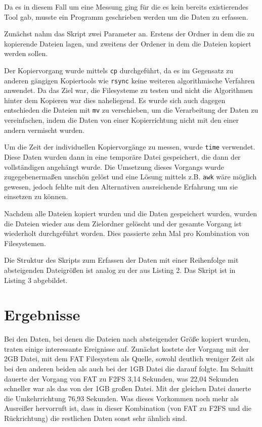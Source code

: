 \documentclass[11pt,parskip=full]{scrartcl}
\begin{document}
	Da es in diesem Fall um eine Messung ging für die es kein bereits existierendes Tool gab, musste ein Programm geschrieben werden um die Daten zu erfassen.
	
	Zunächst nahm das Skript zwei Parameter an. Erstens der Ordner in dem die zu kopierende Dateien lagen, und zweitens der Ordener in dem die Dateien kopiert werden sollen.
	
	Der Kopiervorgang wurde mittels \lstinline|cp| durchgeführt, da es im Gegensatz zu anderen gängigen Kopiertools wie \lstinline|rsync| keine weiteren algorithmische Verfahren anwendet. Da das Ziel war, die Filesysteme zu testen und nicht die Algorithmen hinter dem Kopieren war dies naheliegend. Es wurde sich auch dagegen entschieden die Dateien mit \lstinline|mv| zu verschieben, um die Verarbeitung der Daten zu vereinfachen, indem die Daten von einer Kopierrichtung nicht mit den einer andern vermischt wurden.
	
	Um die Zeit der individuellen Kopiervorgänge zu messen, wurde \lstinline|time| verwendet. Diese Daten wurden dann in eine temporäre Datei gespeichert, die dann der vollständigen angehängt wurde. Die Umsetzung dieses Vorgangs wurde zugegebenermaßen unschön gelöst und eine Lösung mittels z.B. \lstinline|awk| wäre möglich gewesen, jedoch fehlte mit den Alternativen ausreichende Erfahrung um sie einsetzen zu können.
	
	Nachdem alle Dateien kopiert wurden und die Daten gespeichert wurden, wurden die Dateien wieder aus dem Zielordner gelöscht und der gesamte Vorgang ist wiederholt durchgeführt worden. Dies passierte zehn Mal pro Kombination von Filesystemen.
	
	

	Die Struktur des Skripts zum Erfassen der Daten mit einer Reihenfolge mit absteigenden Dateigrößen ist analog zu der aus Listing 2. Das Skript ist in Listing 3 abgebildet.
	


\section{Ergebnisse}

	Bei den Daten, bei denen die Dateien nach absteigender Größe kopiert wurden, traten einige interessante Ereignisse auf. Zunächst kostete der Vorgang mit der 2GB Datei, mit dem FAT Filesystem als Quelle, sowohl deutlich weniger Zeit als bei den anderen beiden als auch bei der 1GB Datei die darauf folgte. Im Schnitt dauerte der Vorgang von FAT zu F2FS 3,14 Sekunden, was 22,04 Sekunden schneller war als das von der 1GB großen Datei. Mit der gleichen Datei dauerte die Umkehrrichtung 76,93 Sekunden. Was dieses Vorkommen noch mehr als Ausreißer hervorruft ist, dass in dieser Kombination (von FAT zu F2FS und die Rückrichtung) die restlichen Daten sonst sehr ähnlich sind.
	
\end{document}
